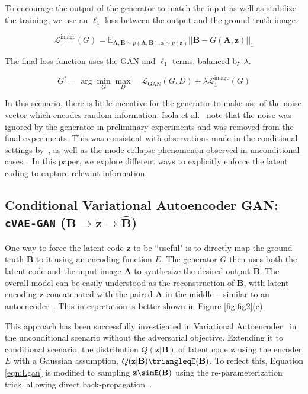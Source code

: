 To encourage the output of the generator to match the input as well as stabilize the training, we use an $\ell_1$ loss between the output and the ground truth image.

\begin{equation}
\mathcal{L}_{1}^{\text{image}}(G) = \mathds{E}_{\mathbf{A},\mathbf{B}\sim p(\mathbf{A},\mathbf{B}),\mathbf{z}\sim p(\mathbf{z})} ||\mathbf{B} - G(\mathbf{A},\mathbf{z}) ||_1
\label{eqn:L1}
\end{equation}

The final loss function uses the GAN and $\ell_1$ terms, balanced by $\lambda$.

\begin{equation}
G^{*} = \arg\min_{G} \max_{D} \quad \mathcal{L}_{\text{GAN}}(G,D) + \lambda \mathcal{L}_1^{\text{image}}(G)
\end{equation}

In this scenario, there is little incentive for the generator to make use of the noise vector which encodes random information. Isola et al.~\citep{isola2016image} note that the noise was ignored by the generator in preliminary experiments and was removed from the final experiments. This was consistent with observations made in the conditional settings by~\citep{pathakCVPR16context,mathieu2015deep}, as well as the mode collapse phenomenon observed in unconditional cases~\citep{salimans2016improved,goodfellow2016nips}. In this paper, we explore different ways to explicitly enforce the latent coding to capture relevant information.

\subsection{Conditional Variational Autoencoder GAN: \texttt{cVAE-GAN} ($\mathbf{B} \rightarrow \mathbf{z} \rightarrow \widehat{\mathbf{B}}$)}
One way to force the latent code $\mathbf{z}$ to be ``useful" is to directly map the ground truth $\mathbf{B}$ to it using an encoding function $E$. The generator $G$ then uses both the latent code and the input image $\mathbf{A}$ to synthesize the desired output $\widehat{\mathbf{B}}$.
The overall model can be easily understood as the reconstruction of $\mathbf{B}$, with latent encoding $\mathbf{z}$ concatenated with the paired $\mathbf{A}$ in the middle -- similar to an autoencoder~\citep{hinton2006reducing}. This interpretation is better shown in Figure \ref{fig:fig2}(c).

This approach has been successfully investigated in Variational Autoencoder~\citep{kingma2013auto} in the unconditional scenario without the adversarial objective. Extending it to conditional scenario, the distribution $Q(\mathbf{z}|\mathbf{B})$ of latent code $\mathbf{z}$ using the encoder $E$ with a Gaussian assumption, $Q(\mathbf{z}|\mathbf{B})\triangleqE(\mathbf{B})$. To reflect this, Equation \ref{eqn:Lgan} is modified to sampling $\mathbf{z}\simE(\mathbf{B})$ using the re-parameterization trick, allowing direct back-propagation~\citep{kingma2013auto}.

